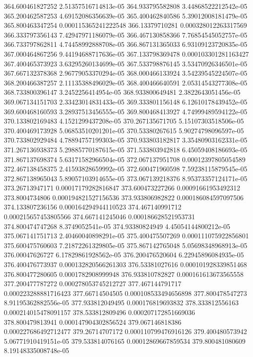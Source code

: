 {364.600461827252 2.51357516714813e-05
364.933795582808 3.44868522212542e-05
365.200462587253 4.69152086356639e-05
365.400462840586 5.39012008181479e-05
365.800463347254 0.000115365241222548
366.13379710281 0.000328012263317569
366.333797356143 7.42947971186079e-05
366.467130858366 7.76854545052757e-05
366.733797862811 4.74458992888708e-05
366.867131365033 6.93109123720835e-05
367.000464867256 9.44194688717636e-05
367.133798369478 0.000103301281163427
367.400465373923 3.63295260134699e-05
367.533798876145 3.53470926346501e-05
367.667132378368 2.96779053370294e-05
368.000466133924 3.54239545224507e-05
368.200466387257 2.11135388496029e-05
368.400466640591 2.05314543277308e-05
368.733800396147 3.2452256414954e-05
368.933800649481 2.3822643051456e-05
369.067134151703 2.33423014831433e-05
369.333801156148 6.12610178439452e-05
369.600468160593 3.28937513456555e-05
369.800468413927 4.74999489594122e-05
370.133802169483 4.1521299437208e-05
370.267135671705 5.15107303518506e-05
370.400469173928 5.06853510201201e-05
370.53380267615 5.90274798096597e-05
370.733802929484 4.78894757199303e-05
370.933803182817 3.35480903162331e-05
371.267136938373 5.29885770187615e-05
371.533803942818 6.45059408186693e-05
371.867137698374 5.63171582966504e-05
372.067137951708 0.00012397805054589
372.467138458375 2.41593828659992e-05
372.600471960598 7.59238115879545e-05
372.867138965043 5.89057103914655e-05
373.067139218376 8.95373357124171e-05
373.26713947171 0.00017179282816847
373.600473227266 0.00091661953492312
373.8004734806 0.000194821527156536
373.933806982822 0.000186084597097506
374.133807236156 0.000164294944110523
374.467140991712 0.000215657453805566
374.667141245046 0.000186628521953731
374.800474747268 8.3749052541e-05
374.93380824949 4.45054144800212e-05
375.067141751713 2.40460040898291e-05
375.400475507269 0.000111075922856801
375.600475760603 7.21872261329805e-05
375.867142765048 5.05698348968913e-05
376.00047626727 6.17829861928562e-05
376.200476520604 6.22945896084935e-05
376.400476773937 0.000132820566261303
376.53381027616 0.000101928339851468
376.800477280605 0.0001782908999948
376.933810782827 0.000161613673565558
377.200477787272 0.000278053745212727
377.467144791717 0.000223288881716423
377.66714504505 0.000108533494656898
377.800478547273 8.91195362882556e-05
377.933812049495 0.000176819693832
378.333812556163 0.000214015478091157
378.533812809496 0.000207172851669036
378.800479813941 0.000147904302856524
379.067146818386 0.000227686492712477
379.26714707172 0.000110799476916126
379.400480573942 5.06771910419151e-05
379.533814076165 0.00012869667859534
379.800481080609 8.19148335008748e-05
}
